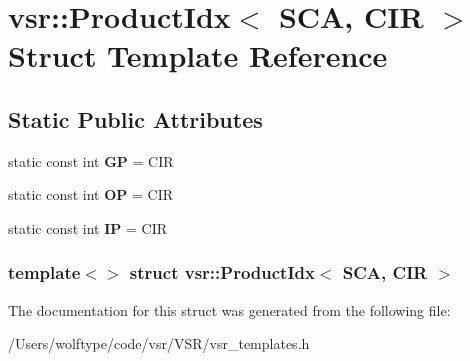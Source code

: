 \hypertarget{structvsr_1_1_product_idx_3_01_s_c_a_00_01_c_i_r_01_4}{\section{vsr\-:\-:Product\-Idx$<$ S\-C\-A, C\-I\-R $>$ Struct Template Reference}
\label{structvsr_1_1_product_idx_3_01_s_c_a_00_01_c_i_r_01_4}
}
\subsection*{Static Public Attributes}
\begin{DoxyCompactItemize}
\item 
\hypertarget{structvsr_1_1_product_idx_3_01_s_c_a_00_01_c_i_r_01_4_a699d979120c6d5fe115b47a9df0a10b4}{static const int {\bfseries G\-P} = C\-I\-R}\label{structvsr_1_1_product_idx_3_01_s_c_a_00_01_c_i_r_01_4_a699d979120c6d5fe115b47a9df0a10b4}

\item 
\hypertarget{structvsr_1_1_product_idx_3_01_s_c_a_00_01_c_i_r_01_4_af2c3a2b9d88ede2e7b5183040058b144}{static const int {\bfseries O\-P} = C\-I\-R}\label{structvsr_1_1_product_idx_3_01_s_c_a_00_01_c_i_r_01_4_af2c3a2b9d88ede2e7b5183040058b144}

\item 
\hypertarget{structvsr_1_1_product_idx_3_01_s_c_a_00_01_c_i_r_01_4_ae1349a66f47a4175e7aae28e63936a3c}{static const int {\bfseries I\-P} = C\-I\-R}\label{structvsr_1_1_product_idx_3_01_s_c_a_00_01_c_i_r_01_4_ae1349a66f47a4175e7aae28e63936a3c}

\end{DoxyCompactItemize}
\subsubsection*{template$<$$>$ struct vsr\-::\-Product\-Idx$<$ S\-C\-A, C\-I\-R $>$}



The documentation for this struct was generated from the following file\-:\begin{DoxyCompactItemize}
\item 
/\-Users/wolftype/code/vsr/\-V\-S\-R/vsr\-\_\-templates.\-h\end{DoxyCompactItemize}
